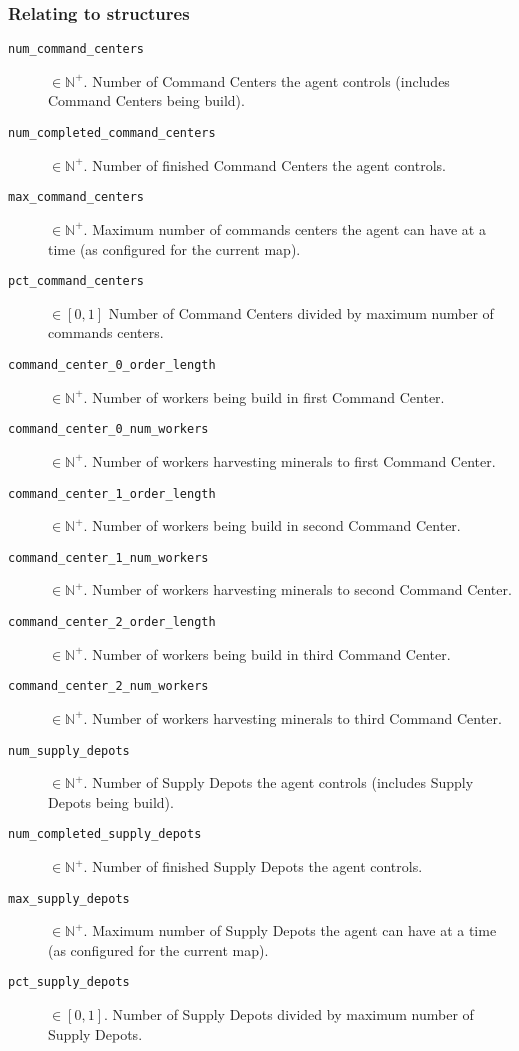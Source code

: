 \subsubsection*{Relating to structures}
\begin{description}
    \item[\texttt{num\_command\_centers}] $\in \mathbb{N}^+$. Number of Command Centers the agent controls (includes Command Centers being build).
    \item[\texttt{num\_completed\_command\_centers}] $\in \mathbb{N}^+$. Number of finished Command Centers the agent controls.
    \item[\texttt{max\_command\_centers}] $\in \mathbb{N}^+$. Maximum number of commands centers the agent can have at a time (as configured for the current map).
    \item[\texttt{pct\_command\_centers}] $\in [0,1]$ Number of Command Centers divided by maximum number of commands centers.
    \item[\texttt{command\_center\_0\_order\_length}] $\in \mathbb{N}^+$. Number of workers being build in first Command Center.
    \item[\texttt{command\_center\_0\_num\_workers}] $\in \mathbb{N}^+$. Number of workers harvesting minerals to first Command Center.
    \item[\texttt{command\_center\_1\_order\_length}] $\in \mathbb{N}^+$. Number of workers being build in second Command Center.
    \item[\texttt{command\_center\_1\_num\_workers}] $\in \mathbb{N}^+$. Number of workers harvesting minerals to second Command Center.
    \item[\texttt{command\_center\_2\_order\_length}] $\in \mathbb{N}^+$. Number of workers being build in third Command Center.
    \item[\texttt{command\_center\_2\_num\_workers}] $\in \mathbb{N}^+$. Number of workers harvesting minerals to third Command Center.
    \item[\texttt{num\_supply\_depots}] $\in \mathbb{N}^+$. Number of Supply Depots the agent controls (includes Supply Depots being build).
    \item[\texttt{num\_completed\_supply\_depots}] $\in \mathbb{N}^+$. Number of finished Supply Depots the agent controls.
    \item[\texttt{max\_supply\_depots}] $\in \mathbb{N}^+$. Maximum number of Supply Depots the agent can have at a time (as configured for the current map).
    \item[\texttt{pct\_supply\_depots}] $\in [0,1]$. Number of Supply Depots divided by maximum number of Supply Depots.

\end{description}
